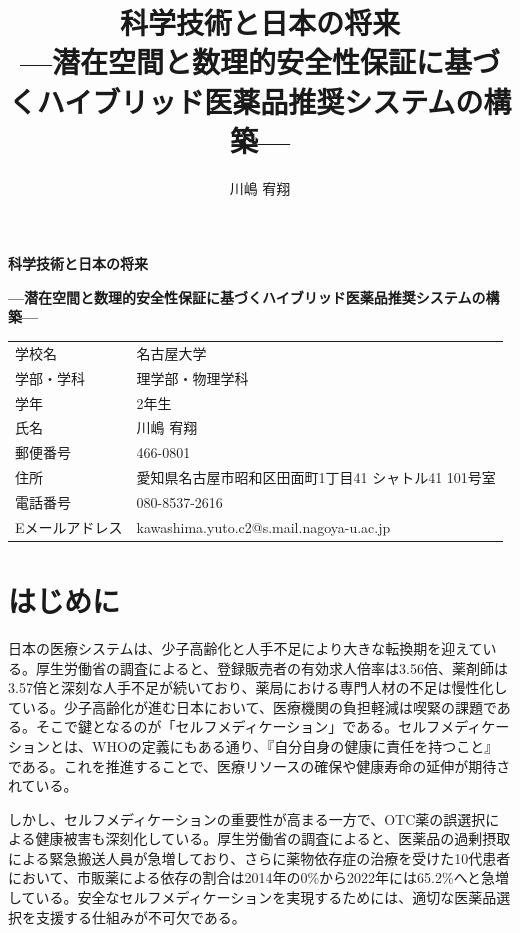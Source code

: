 \documentclass[a4paper,11pt]{bxjsarticle}
\title{科学技術と日本の将来\\
\large{---潜在空間と数理的安全性保証に基づくハイブリッド医薬品推奨システムの構築---}}
\author{川嶋 宥翔}
\date{}
\theoremstyle{definition}
\begin{document}
\thispagestyle{empty}
\begin{center}
\vspace*{2cm}

{\Large \textbf{科学技術と日本の将来}}

\vspace{1cm}

{\large \textbf{---潜在空間と数理的安全性保証に基づくハイブリッド医薬品推奨システムの構築---}}

\vspace{5cm}

\begin{tabular}{ll}
学校名 & 名古屋大学 \\
学部・学科 & 理学部・物理学科 \\
学年 & 2年生 \\
氏名 & 川嶋 宥翔 \\
郵便番号 & 466-0801 \\
住所 & 愛知県名古屋市昭和区田面町1丁目41 シャトル41 101号室 \\
電話番号 & 080-8537-2616 \\
Eメールアドレス & kawashima.yuto.c2@s.mail.nagoya-u.ac.jp \\
\end{tabular}

\vspace{3cm}

\end{center}

\newpage

\setcounter{page}{1}

\section{はじめに}

日本の医療システムは、少子高齢化と人手不足により大きな転換期を迎えている。厚生労働省の調査によると、登録販売者の有効求人倍率は3.56倍、薬剤師は3.57倍と深刻な人手不足が続いており、薬局における専門人材の不足は慢性化している。少子高齢化が進む日本において、医療機関の負担軽減は喫緊の課題である。そこで鍵となるのが「セルフメディケーション」である。セルフメディケーションとは、WHOの定義にもある通り、『自分自身の健康に責任を持つこと』である。これを推進することで、医療リソースの確保や健康寿命の延伸が期待されている。

しかし、セルフメディケーションの重要性が高まる一方で、OTC薬の誤選択による健康被害も深刻化している。厚生労働省の調査によると、医薬品の過剰摂取による緊急搬送人員が急増しており、さらに薬物依存症の治療を受けた10代患者において、市販薬による依存の割合は2014年の0\%から2022年には65.2\%へと急増している。安全なセルフメディケーションを実現するためには、適切な医薬品選択を支援する仕組みが不可欠である。
\end{document}
